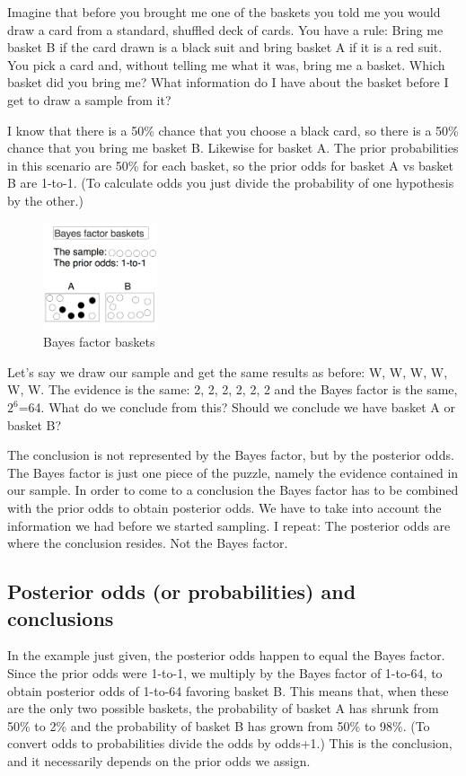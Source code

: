 Imagine that before you brought me one of the baskets you told me you would draw a card from a standard, shuffled deck of cards. You have a rule: Bring me basket B if the card drawn is a black suit and bring basket A if it is a red suit. You pick a card and, without telling me what it was, bring me a basket. Which basket did you bring me? What information do I have about the basket before I get to draw a sample from it?

I know that there is a 50\% chance that you choose a black card, so there is a 50\% chance that you bring me basket B. Likewise for basket A. The prior probabilities in this scenario are 50\% for each basket, so the prior odds for basket A vs basket B are 1-to-1. (To calculate odds you just divide the probability of one hypothesis by the other.)


\begin{figure}[h]
\centering
\includegraphics[width=0.3\textwidth]{pic/p05c03-snip19.png}
\caption{Bayes factor baskets}
\label{fig:p05c03-snip19}
\end{figure}

Let's say we draw our sample and get the same results as before: {W, W, W, W, W, W}. The evidence is the same: {2, 2, 2, 2, 2, 2} and the Bayes factor is the same, $2^6$=64. What do we conclude from this? Should we conclude we have basket A or basket B?

The conclusion is not represented by the Bayes factor, but by the posterior odds. The Bayes factor is just one piece of the puzzle, namely the evidence contained in our sample. In order to come to a conclusion the Bayes factor has to be combined with the prior odds to obtain posterior odds. We have to take into account the information we had before we started sampling. I repeat: The posterior odds are where the conclusion resides. Not the Bayes factor.

\subsection{Posterior odds (or probabilities) and conclusions}

In the example just given, the posterior odds happen to equal the Bayes factor. Since the prior odds were 1-to-1, we multiply by the Bayes factor of 1-to-64, to obtain posterior odds of 1-to-64 favoring basket B. This means that, when these are the only two possible baskets, the probability of basket A has shrunk from 50\% to 2\% and the probability of basket B has grown from 50\% to 98\%. (To convert odds to probabilities divide the odds by odds+1.) This is the conclusion, and it necessarily depends on the prior odds we assign. 

